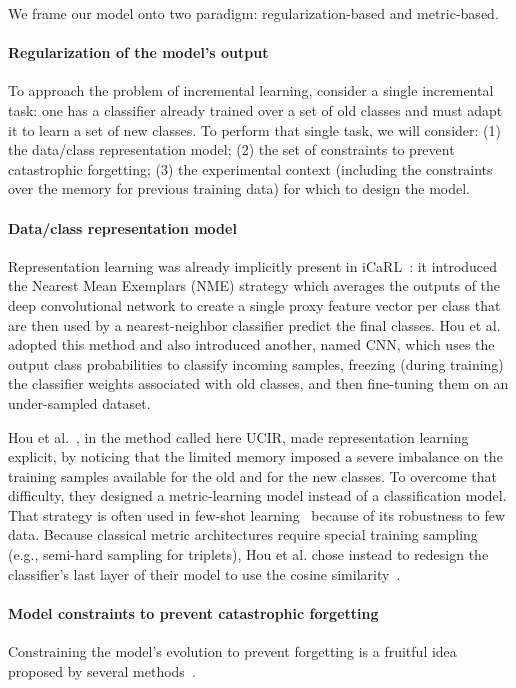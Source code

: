 We frame our model onto two paradigm: regularization-based and metric-based.

\paragraph{Regularization of the model's output}

To approach the problem of incremental learning, consider a single incremental task: one has a
classifier already trained over a set of old classes and must adapt it to learn a set of new
classes. To perform that single task, we will consider: (1) the data/class representation model; (2)
the set of constraints to prevent catastrophic forgetting; (3) the experimental context (including
the constraints over the memory for previous training data) for which to design the model.

\paragraph{Data/class representation model} Representation learning was already implicitly present
in iCaRL~\citep{rebuffi2017icarl}: it introduced the Nearest Mean Exemplars (NME) strategy which
averages the outputs of the deep convolutional network to create a single proxy feature vector per
class that are then used by a nearest-neighbor classifier predict the final classes. Hou et
al.~\citep{hou2019ucir} adopted this method and also introduced another, named CNN, which uses the
output class probabilities to classify incoming samples, freezing (during training) the classifier
weights associated with old classes, and then fine-tuning them on an under-sampled dataset.

Hou et al.~\citep{hou2019ucir}, in the method called here UCIR, made representation learning
explicit, by noticing that the limited memory imposed a severe imbalance on the training samples
available for the old and for the new classes. To overcome that difficulty, they designed a
metric-learning model instead of a classification model. That strategy is often used in few-shot
learning~\citep{gidaris2018fewshot_wo_forgetting} because of its robustness to few data. Because
classical metric architectures require special training sampling (e.g., semi-hard sampling for
triplets), Hou et al. chose instead to redesign the classifier's last layer of their model to use
the cosine similarity~\citep{luo2018cosine_classifier}.

\paragraph{Model constraints to prevent catastrophic forgetting} Constraining the model's evolution
to prevent forgetting is a fruitful idea proposed by several
methods~\citep{kirkpatrick2017ewc,lopezpaz2017gem,aljundi2018MemoryAwareSynapses,li2018lwf,rebuffi2017icarl,castro2018end_to_end_inc_learn}.

